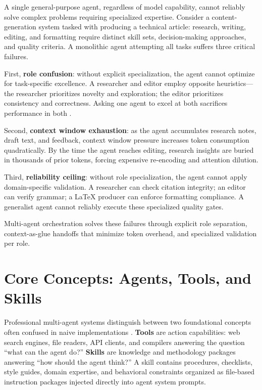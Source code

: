 A single general-purpose agent, regardless of model capability, cannot reliably solve complex problems requiring specialized expertise. Consider a content-generation system tasked with producing a technical article: research, writing, editing, and formatting require distinct skill sets, decision-making approaches, and quality criteria. A monolithic agent attempting all tasks suffers three critical failures.

First, \textbf{role confusion}: without explicit specialization, the agent cannot optimize for task-specific excellence. A researcher and editor employ opposite heuristics—the researcher prioritizes novelty and exploration; the editor prioritizes consistency and correctness. Asking one agent to excel at both sacrifices performance in both \cite{Segal2026}.

Second, \textbf{context window exhaustion}: as the agent accumulates research notes, draft text, and feedback, context window pressure increases token consumption quadratically. By the time the agent reaches editing, research insights are buried in thousands of prior tokens, forcing expensive re-encoding and attention dilution.

Third, \textbf{reliability ceiling}: without role specialization, the agent cannot apply domain-specific validation. A researcher can check citation integrity; an editor can verify grammar; a LaTeX producer can enforce formatting compliance. A generalist agent cannot reliably execute these specialized quality gates.

Multi-agent orchestration solves these failures through explicit role separation, context-as-glue handoffs that minimize token overhead, and specialized validation per role.

\section{Core Concepts: Agents, Tools, and Skills}

Professional multi-agent systems distinguish between two foundational concepts often confused in naive implementations \cite{Segal2026}. \textbf{Tools} are action capabilities: web search engines, file readers, API clients, and compilers answering the question ``what can the agent do?'' \textbf{Skills} are knowledge and methodology packages answering ``how should the agent think?'' A skill contains procedures, checklists, style guides, domain expertise, and behavioral constraints organized as file-based instruction packages injected directly into agent system prompts.

